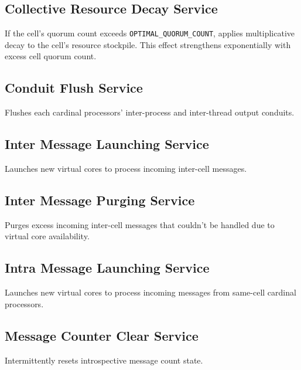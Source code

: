 \subsection{Collective Resource Decay Service}


If the cell's quorum count exceeds \texttt{OPTIMAL\_QUORUM\_COUNT}, applies multiplicative decay to the cell's resource stockpile.
This effect strengthens exponentially with excess cell quorum count.

\subsection{Conduit Flush Service}


Flushes each cardinal processors' inter-process and inter-thread output conduits.

\subsection{Inter Message Launching Service}


Launches new virtual cores to process incoming inter-cell messages.

\subsection{Inter Message Purging Service}


Purges excess incoming inter-cell messages that couldn't be handled due to virtual core availability.

\subsection{Intra Message Launching Service}


Launches new virtual cores to process incoming messages from same-cell cardinal processors.

\subsection{Message Counter Clear Service}


Intermittently resets introspective message count state.

